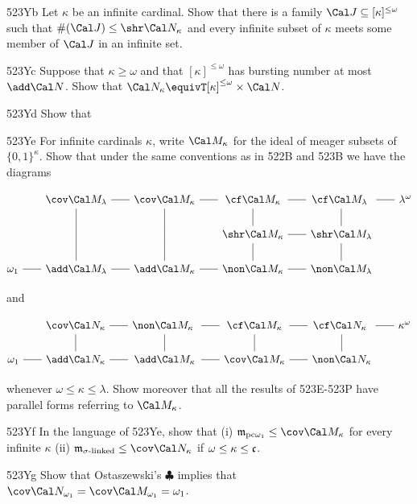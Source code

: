 {\spheader 523Yb Let $\kappa$ be an infinite cardinal.   Show that there is
a family $\Cal J\subseteq[\kappa]^{\le\omega}$ such that
$\#(\Cal J)\le\shr\Cal N_{\kappa}$ and every infinite subset of $\kappa$
meets some member of $\Cal J$ in an infinite set.

\spheader 523Yc Suppose that $\kappa\ge\omega$ and that
$[\kappa]^{\le\omega}$ has bursting number at most $\add\Cal N$.   Show
that $\Cal N_{\kappa}\equivT[\kappa]^{\le\omega}\times\Cal N$.

\spheader 523Yd Show that


\spheader 523Ye For infinite cardinals $\kappa$, write $\Cal M_{\kappa}$
for the ideal of meager subsets of $\{0,1\}^{\kappa}$.   Show that under
the same conventions as in 522B and 523B we have the diagrams

$$\vbox{\offinterlineskip
\halign{\hfil#\hfil&\hfil#\hfil&\hfil#\hfil&\hfil#\hfil
  &\hfil#\hfil&\hfil#\hfil&\hfil#\hfil
  &\hfil#\hfil&\hfil#\hfil&\hfil#\hfil
  &\hfil#\hfil&\hfil#\hfil&\hfil#\hfil&\hfil#\hfil\cr
&\tmpstrut&$\cov\Cal M_{\lambda}$&\tmphrule
  &$\cov\Cal M_{\kappa}$&\tmphrule
  &$\cf\Cal M_{\kappa}$&\tmphrule&$\cf\Cal M_{\lambda}$
  &\tmphrule&$\lambda^{\omega}$\cr
&\tmpstrut&\vrule&&\vrule&&\vrule&&\vrule\cr
&\tmpstrut&\vrule&&\vrule&&$\shr\Cal M_{\kappa}$&\tmphrule
  &$\shr\Cal M_{\lambda}$\cr
&\tmpstrut&\vrule&&\vrule&&\vrule&&\vrule\cr
$\tmpstrut\omega_1$&\tmphrule&$\add\Cal M_{\lambda}$&\tmphrule
  &$\add\Cal M_{\kappa}$&\tmphrule
  &$\non\Cal M_{\kappa}$&\tmphrule&$\non\Cal M_{\lambda}$\cr
}}$$

\noindent and

$$\vbox{\offinterlineskip
\halign{\hfil#\hfil&\hfil#\hfil&\hfil#\hfil&\hfil#\hfil
  &\hfil#\hfil&\hfil#\hfil&\hfil#\hfil
  &\hfil#\hfil&\hfil#\hfil&\hfil#\hfil&\hfil#\hfil\cr
&\tmpstrut&$\cov\Cal N_{\kappa}$&\tmphrule&$\non\Cal M_{\kappa}$
  &\tmphrule
  &$\cf\Cal M_{\kappa}$&\tmphrule&$\cf\Cal N_{\kappa}$
  &\tmphrule&$\kappa^{\omega}$\cr
&\tmpstrut&\vrule&&\vrule&&\vrule&&\vrule\cr
$\tmpstrut\omega_1$&\tmphrule&$\add\Cal N_{\kappa}$&\tmphrule
  &$\add\Cal M_{\kappa}$&\tmphrule
  &$\cov\Cal M_{\kappa}$&\tmphrule&$\non\Cal N_{\kappa}$\cr
}}$$

\noindent whenever $\omega\le\kappa\le\lambda$.   Show moreover that all
the results of
523E-523P %
have parallel forms referring to $\Cal M_{\kappa}$.

\spheader 523Yf In the language of 523Ye, show that (i)
$\frak m_{\text{pc}\omega_1}\le\cov\Cal M_{\kappa}$ for every infinite
$\kappa$ (ii) $\frak m_{\sigma\text{-linked}}\le\cov\Cal N_{\kappa}$ if
$\omega\le\kappa\le\frak c$.   

\spheader 523Yg Show that Ostaszewski's $\clubsuit$ implies that
$\cov\Cal N_{\omega_1}=\cov\Cal M_{\omega_1}=\omega_1$.
}%


